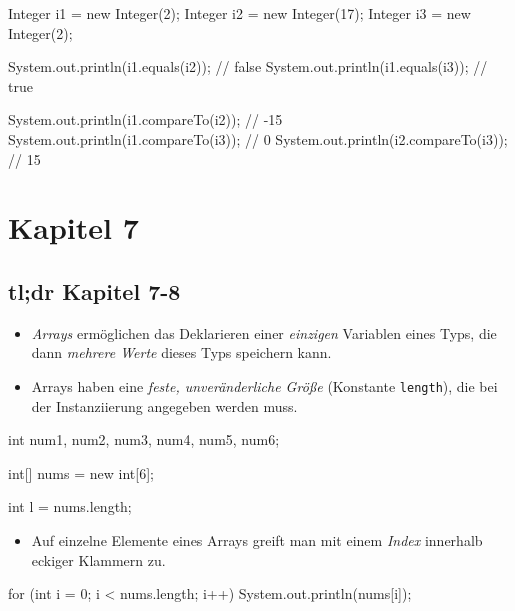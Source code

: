 \documentclass[a4paper,10pt, dvipsnames]{report}
\begin{document}
\begin{javacodebox}
Integer i1 = new Integer(2);
Integer i2 = new Integer(17);
Integer i3 = new Integer(2);

System.out.println(i1.equals(i2)); // false
System.out.println(i1.equals(i3)); // true

System.out.println(i1.compareTo(i2)); // -15
System.out.println(i1.compareTo(i3)); // 0
System.out.println(i2.compareTo(i3)); // 15
\end{javacodebox}


\chapter{Kapitel 7}

\section{tl;dr Kapitel 7-8}

\begin{itemize}
	\item \textit{Arrays} ermöglichen das Deklarieren einer \textit{einzigen} Variablen eines Typs, die dann \textit{mehrere Werte} dieses Typs speichern kann.
	\item Arrays haben eine \textit{feste, unveränderliche Größe} (Konstante \texttt{length}), die bei der Instanziierung angegeben werden muss.
\end{itemize}

\begin{javacodebox}
int num1, num2, num3, num4, num5, num6;
\end{javacodebox}

\begin{javacodebox}
int[] nums = new int[6];
\end{javacodebox}

\begin{javacodebox}
int l = nums.length;
\end{javacodebox}

\begin{itemize}
	\item Auf einzelne Elemente eines Arrays greift man mit einem \textit{Index} innerhalb eckiger Klammern zu.
\end{itemize}

\begin{javacodebox}
for (int i = 0; i < nums.length; i++) {
	System.out.println(nums[i]);
}
\end{javacodebox}
\end{document}
